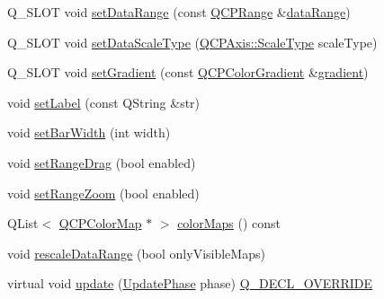 \begin{DoxyCompactItemize}
\item 
Q\+\_\+\+S\+L\+OT void \mbox{\hyperlink{class_q_c_p_color_scale_abe88633003a26d1e756aa74984587fef}{set\+Data\+Range}} (const \mbox{\hyperlink{class_q_c_p_range}{Q\+C\+P\+Range}} \&\mbox{\hyperlink{class_q_c_p_color_scale_a51f5756f99867bd91e570eddefeb1ef4}{data\+Range}})
\item 
Q\+\_\+\+S\+L\+OT void \mbox{\hyperlink{class_q_c_p_color_scale_aeb6107d67dd7325145b2498abae67fc3}{set\+Data\+Scale\+Type}} (\mbox{\hyperlink{class_q_c_p_axis_a36d8e8658dbaa179bf2aeb973db2d6f0}{Q\+C\+P\+Axis\+::\+Scale\+Type}} scale\+Type)
\item 
Q\+\_\+\+S\+L\+OT void \mbox{\hyperlink{class_q_c_p_color_scale_a1f29583bb6f1e7f473b62fb712be3940}{set\+Gradient}} (const \mbox{\hyperlink{class_q_c_p_color_gradient}{Q\+C\+P\+Color\+Gradient}} \&\mbox{\hyperlink{class_q_c_p_color_scale_a31d4e3b49461bf6b265eabd028d0f7b2}{gradient}})
\item 
void \mbox{\hyperlink{class_q_c_p_color_scale_aee124ae8396320cacf8276e9a0fbb8ce}{set\+Label}} (const Q\+String \&str)
\item 
void \mbox{\hyperlink{class_q_c_p_color_scale_ab9dcc0c1cd583477496209b1413bcb99}{set\+Bar\+Width}} (int width)
\item 
void \mbox{\hyperlink{class_q_c_p_color_scale_a21c51a55e4fd581b6feadca9ee5b38d5}{set\+Range\+Drag}} (bool enabled)
\item 
void \mbox{\hyperlink{class_q_c_p_color_scale_a96bd60fb6317ad6821841b539c93eeeb}{set\+Range\+Zoom}} (bool enabled)
\item 
Q\+List$<$ \mbox{\hyperlink{class_q_c_p_color_map}{Q\+C\+P\+Color\+Map}} $\ast$ $>$ \mbox{\hyperlink{class_q_c_p_color_scale_a556adc6b0216ebc1cc4317c541956d06}{color\+Maps}} () const
\item 
void \mbox{\hyperlink{class_q_c_p_color_scale_a425983db4478543924ddbd04ea20a356}{rescale\+Data\+Range}} (bool only\+Visible\+Maps)
\item 
virtual void \mbox{\hyperlink{class_q_c_p_color_scale_a259dcb6d3053a2cc3c197e9b1191ddbe}{update}} (\mbox{\hyperlink{class_q_c_p_layout_element_a0d83360e05735735aaf6d7983c56374d}{Update\+Phase}} phase) \mbox{\hyperlink{qcustomplot_8h_a42cc5eaeb25b85f8b52d2a4b94c56f55}{Q\+\_\+\+D\+E\+C\+L\+\_\+\+O\+V\+E\+R\+R\+I\+DE}}
\end{DoxyCompactItemize}
